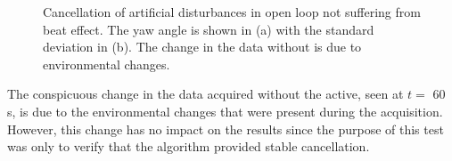 \begin{figure}[h!]
  \centering %
  \qquad
  \caption{\label{fig:nobeat}Cancellation of artificial disturbances in open loop not suffering from beat effect. The yaw angle is shown in (a) with the standard deviation in (b). The change in the data without \abbrRFDC is due to environmental changes.}
\end{figure}
\FloatBarrier
The conspicuous change in the data acquired without the \abbrRFDC active, seen at $t=$ 60 s, is due to the environmental changes that were present during the acquisition. However, this change has no impact on the results since the purpose of this test was only to verify that the algorithm provided stable cancellation.

